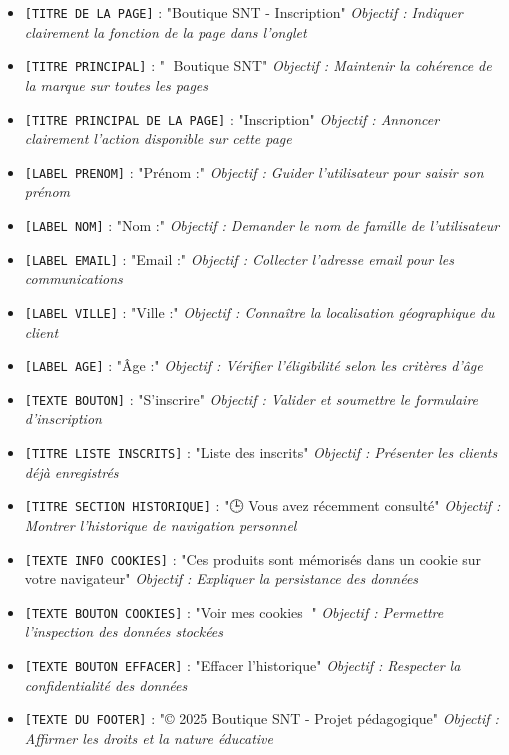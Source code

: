 \documentclass[12pt,a4paper]{article}
\begin{document}
\begin{itemize}
\item \texttt{[TITRE DE LA PAGE]} : "Boutique SNT - Inscription" \newline \textit{Objectif : Indiquer clairement la fonction de la page dans l'onglet}
\item \texttt{[TITRE PRINCIPAL]} : "🛒 Boutique SNT" \newline \textit{Objectif : Maintenir la cohérence de la marque sur toutes les pages}
\item \texttt{[TITRE PRINCIPAL DE LA PAGE]} : "Inscription" \newline \textit{Objectif : Annoncer clairement l'action disponible sur cette page}
\item \texttt{[LABEL PRENOM]} : "Prénom :" \newline \textit{Objectif : Guider l'utilisateur pour saisir son prénom}
\item \texttt{[LABEL NOM]} : "Nom :" \newline \textit{Objectif : Demander le nom de famille de l'utilisateur}
\item \texttt{[LABEL EMAIL]} : "Email :" \newline \textit{Objectif : Collecter l'adresse email pour les communications}
\item \texttt{[LABEL VILLE]} : "Ville :" \newline \textit{Objectif : Connaître la localisation géographique du client}
\item \texttt{[LABEL AGE]} : "Âge :" \newline \textit{Objectif : Vérifier l'éligibilité selon les critères d'âge}
\item \texttt{[TEXTE BOUTON]} : "S'inscrire" \newline \textit{Objectif : Valider et soumettre le formulaire d'inscription}
\item \texttt{[TITRE LISTE INSCRITS]} : "Liste des inscrits" \newline \textit{Objectif : Présenter les clients déjà enregistrés}
\item \texttt{[TITRE SECTION HISTORIQUE]} : "🕒 Vous avez récemment consulté" \newline \textit{Objectif : Montrer l'historique de navigation personnel}
\item \texttt{[TEXTE INFO COOKIES]} : "Ces produits sont mémorisés dans un cookie sur votre navigateur" \newline \textit{Objectif : Expliquer la persistance des données}
\item \texttt{[TEXTE BOUTON COOKIES]} : "Voir mes cookies 🍪" \newline \textit{Objectif : Permettre l'inspection des données stockées}
\item \texttt{[TEXTE BOUTON EFFACER]} : "Effacer l'historique" \newline \textit{Objectif : Respecter la confidentialité des données}
\item \texttt{[TEXTE DU FOOTER]} : "© 2025 Boutique SNT - Projet pédagogique" \newline \textit{Objectif : Affirmer les droits et la nature éducative}
\end{itemize}
\end{document}
